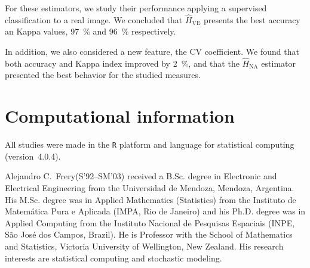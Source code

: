 \documentclass[journal]{IEEEtran}
\begin{document}
For these estimators, we study their performance applying a supervised classification to a real image. 
We concluded that $\widehat{H}_{\text{VE}}$ presents the best accuracy an Kappa values, \SI{97}{\percent} and \SI{96}{\percent} respectively. 

In addition, we also considered a new feature, the CV coefficient. We found that both accuracy and Kappa index improved by \SI{2}{\percent}, and that the $\widehat{H}_{\text{NA}}$ estimator presented the best behavior for the studied measures.

\section{Computational information}
\label{conclusion}

All studies were made in the \texttt R platform and language for statistical computing~\cite{RLanguage} (version~4.0.4).




\begin{IEEEbiography}{Alejandro C.\ Frery}(S'92--SM'03)
	received a B.Sc. degree in Electronic and Electrical Engineering from the Universidad de Mendoza, Mendoza, Argentina.
	His M.Sc. degree was in Applied Mathematics (Statistics) from the Instituto de Matem\'atica Pura e Aplicada (IMPA, Rio de Janeiro) and his Ph.D. degree was in Applied Computing from the Instituto Nacional de Pesquisas Espaciais (INPE, S\~ao Jos\'e dos Campos, Brazil).
	He is Professor with the School of Mathematics and Statistics, Victoria University of Wellington, New Zealand.
	His research interests are statistical computing and stochastic modeling.
\end{IEEEbiography}
\end{document}
